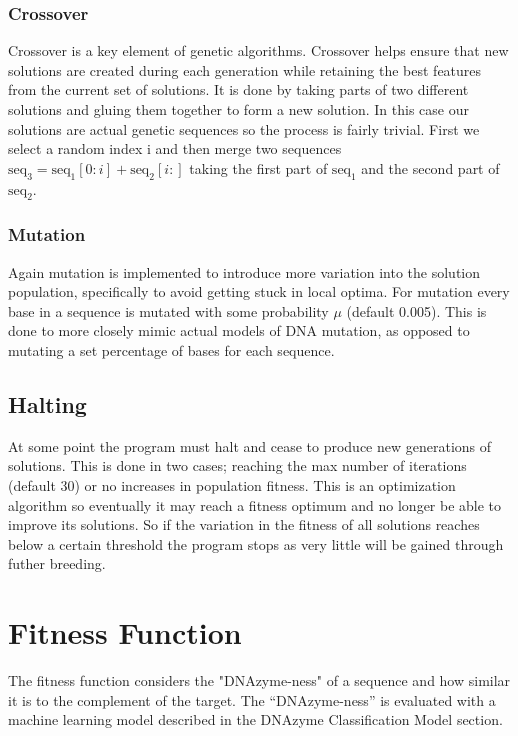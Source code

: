 \documentclass[11pt]{article}
\begin{document}
\subsubsection*{Crossover}
Crossover is a key element of genetic algorithms.
Crossover helps ensure that new solutions are created during each generation while retaining the best features from the current set of solutions.
It is done by taking parts of two different solutions and gluing them together to form a new solution.
In this case our solutions are actual genetic sequences so the process is fairly trivial.
First we select a random index i and then merge two sequences
$\text{seq}_3 = \text{seq}_1[0:i] + \text{seq}_2[i:]$
taking the first part of $\text{seq}_1$ and the second part of $\text{seq}_2$.

\subsubsection*{Mutation}
Again mutation is implemented to introduce more variation into the solution population, specifically to avoid getting stuck in local optima.
For mutation every base in a sequence is mutated with some probability $\mu$ (default 0.005).
This is done to more closely mimic actual models of DNA mutation, as opposed to mutating a set percentage of bases for each sequence.

\subsection*{Halting}
At some point the program must halt and cease to produce new generations of solutions.
This is done in two cases; reaching the max number of iterations (default 30) or no increases in population fitness.
This is an optimization algorithm so eventually it may reach a fitness optimum and no longer be able to improve its solutions.
So if the variation in the fitness of all solutions reaches below a certain threshold  the program stops as very little will be gained through futher breeding.

\section*{Fitness Function}
The fitness function considers the "DNAzyme-ness" of a sequence and how similar it is to the complement of the target.
The ``DNAzyme-ness'' is evaluated with a machine learning model described in the DNAzyme Classification Model section.
\end{document}
